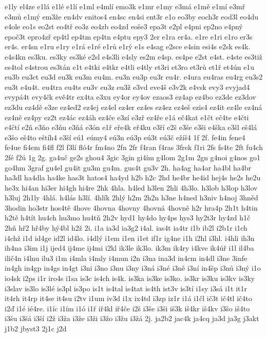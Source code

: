 {e1ly
el4ze
e1lá
e1lé
e1lí
e1ml
e4mlí
emo3k
e1mr
e1my
e3má
e1mě
e1mí
e3mř
e3mů
e1mý
em3že
en4dv
enitos4
en4sc
en4si
ent3r
e1o
eo3by
eoch3r
eod3l
eo4du
e4ole
eo1s
eo2st
eo4tř
eo3z
eo4zb
eo4zd
eoše3
epa3t
e2pl
e4pni
ep2no
e4pný
epoč3t
epro4zř
ep4tl
ep4tm
ep4tn
e4ptu
epy3
2er
e1ra
er4a.
e1re
e1ri
e1ro
er3s
er4s.
er4sn
e1ru
e1ry
e1rá
e1ré
e1rů
e1rý
e1s
e4sag
e2sce
e4sin
esi4s
e2sk
es4k.
e4s4kn
es3ku.
es3ky
es3ké
e2sl
e4s3li
e4sly
es2m
e4sp.
es4pe
e2st
e4st.
e4ste
es3tiž
es4tol
e4strou
es3tán
e1t
e4tki
e4tkr
e4tli
e4tly
et3ri
et3ro
et3rů
et1ř
et4ún
e1u
eu3b
eu3ct
eu3d
eu3k
eu3m
eu4m.
eu3n
eu3p
eu3r
eu4r.
e4ura
eu4ras
eu4rg
eu3s2
eu3t
e4u4t.
eu4tra
eu4ts
eu3v
eu3z
eu3ž
e3vd
eve4š
e3v2k
e4vsk
evy3
evyjad4
evypá4t
evy4čk
evě4tr
ex4ta
e3xu
ey4or
ey4ov
ezaos3
ez4ap
ez4bo
ez3de
ez3dov
ez3du
ez4dě
e3ze
ez4ed2
ez4ej
ez4el
ez4er
ez4es
ez4ez
ez4eš
ezis4
ez4it
ez4le
ez4ná
ez4ně
ez4py
ez2t
ez4ác
ez4áh
ez4če
e3zí
e3zř
ez4ře
e1á
eč4kat
e1čt
eč4te
e4čti
e4čtí
e2ň
e3ňo
e3ňu
e3ňá
e3ón
e1ř
eře4k
eř4ku
e3ří
e2š
e3še
e3ši
e4ška
e3šl
eš4lá
e3šo
eš4to
eštíh4
e3ší
eú1
eúmy4
eú3n
eú3p
eú3t
eú3č
ežíš4
1f
2f.
fe4in
fene4
fe4ue
fi4em
fi4fl
f2l
f3lí
fló4r
fm4no
2fn
2fr
f4ran
f4ras
3frek
f1ri
2fs
fs4te
2ft
fu4ch
2fé
f2ú
1g
2g.
ga4uč
ge2s
ghou4
3gic
3gin
gi4ím
g4lom
2g1m
2gn
g4noi
g4nos
go1
go4hm
3graf
gu4el
gu4it
gu3m
gu4m.
gus4t
gu3v
2h.
ha4ag
ha4ar
ha4bl
ha4br
ha3dl
ha4dla
ha4ke
has3t
hatos4
ha4yd
h2b
h2c
2hd
he4br
he4id
hej4s
he2s
he2u
he3x
hi4an
hi3er
hi4gh
hi4re
2hk
4hla.
h4led
h3len
2hli
4h3lo.
h3lob
h3lop
h3lov
h3luj
2h1ly
4hlá.
h4lás
h3lí.
4hlík
2hlý
h2m
2h2n
h3ne
h4ned
h3niv
h4noj
3hněd
3hodin
ho3str
hos4tě
4hove
4hovna
4hovny
4hovná
4hovně
h2r
hra4p
2h1t
h4tin
h2tě
h4tít
hu4ch
hu3mo
hu4tň
2h2v
hyd1
hy4do
hy4ps
hys3
hy2t3r
hy4zd
h1č
2hň
hř2
hř4by
hý4bl
h2ž
2i.
i1a
ia3d
ia3g2
i4al.
ias4t
ia4tr
i1b
ib2l
i2b1r
i1ch
i4chž
i1d
id4ge
id2l
id4lo.
i4dlý
i1em
i1en
i1et
if1r
ig4ne
i1h
i2hl
i3hl.
i4hli
ih3n
ih4na
i3im
i1j
ijed4
ij4me
ij4mi
i2kl
ik3le
ik3lo.
ik3m
ik4ry
i4kve
ik4úř
i1l
il4ba
ilič4n
i4lnu
ilu3
i1m
i4mla
i4mly
i4mun
i2n
i3na
ina3d
in4cm
in4dl
i3ne
3infe
in4gh
in4gp
in4gs
in4gt
i3ni
i3no
i3nu
i3ny
i3ná
i3né
i3ně
i3ní
in4šp
i3nů
i3ný
i1o
io4sk
i2ps
i1r
iro4s
i1sa
is3c
is4ch
is4k.
is3ka
is3ke
is3ko.
is3kr
is3ku
is3kv
is3ky
i3slav
is3lo
is3lé
is3pl
is3po
is1t
is4tal
is4tat
is4th
ist3v
is3tí
i1sy
i3sá
i1t
it1r
it4rh
it4rp
it4se
it4su
i2tv
i1um
iv3d
i1x
ix4td
i3zp
iz1r
i1á
i1čl
ič3t
ič4tl
ič4to
i2ď
i1é
ié4re.
i1íc
i1ím
i1ó
i1ř
iř4kl
iř4če
i2š
i3še
i3ši
iš3k
iš4kr
iš4kv
i3šo
iš4to
i3šu
i3šá
i3ší
i2ž
i3ža
i3že
i3ži
i3žo
i3žu
i3žá
2j.
ja2b2
jac4k
ja4cq
ja3d
ja3g
j3akt
j1b2
jbyst3
2j1c
j2d
}
